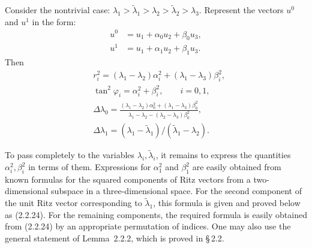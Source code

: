 \documentclass[11pt,oneside]{book}
\begin{document}
Consider the nontrivial case: $\lambda_1 > \tilde{\lambda}_1 > \lambda_2 > \tilde{\lambda}_2 > \lambda_3$. Represent the vectors $u^0$ and $u^1$ in the form:
\begin{align*}
u^0 &= u_1 + \alpha_0 u_2 + \beta_0 u_3, \\
u^1 &= u_1 + \alpha_1 u_2 + \beta_1 u_3.
\end{align*}
Then
\begin{align*}
&r_i^2 = (\lambda_1 - \lambda_2)\alpha_i^2 + (\lambda_1 - \lambda_3)\beta_i^2, \\
&\tan^2 \varphi_i = \alpha_i^2 + \beta_i^2, \qquad i = 0, 1, \\[1ex]
&\Delta\lambda_0 = \frac{(\lambda_1 - \lambda_2)\alpha_0^2 + (\lambda_1 - \lambda_3)\beta_0^2}{\lambda_1 - \lambda_2 - (\lambda_2 - \lambda_3)\beta_0^2}, \\[1ex]
&\Delta\lambda_1 = (\lambda_1 - \tilde{\lambda}_1) / (\tilde{\lambda}_1 - \lambda_2).
\end{align*}

To pass completely to the variables $\lambda_i, \tilde{\lambda}_i$, it remains to express the quantities $\alpha_i^2, \beta_i^2$ in terms of them. Expressions for $\alpha_1^2$ and $\beta_1^2$ are easily obtained from known formulas for the squared components of Ritz vectors from a two-dimensional subspace in a three-dimensional space. For the second component of the unit Ritz vector corresponding to $\tilde{\lambda}_1$, this formula is given and proved below as (2.2.24). For the remaining components, the required formula is easily obtained from (2.2.24) by an appropriate permutation of indices. One may also use the general statement of Lemma~2.2.2, which is proved in \S\,2.2.
\end{document}

